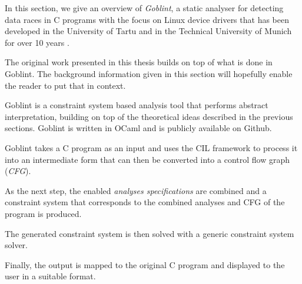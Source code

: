 \documentclass[..thesis.tex]{subfiles}
\begin{document}

In this section, we give an overview of \textit{Goblint}, a static analyser for detecting data races in C programs with the focus on Linux device drivers
that has been developed in the University of Tartu and in the Technical University of Munich for over 10 years
\cite{vojdani_static_2016,_goblint_????,apinis_frameworks_2014,vojdanivesal_static_2010}.



The original work presented in this thesis builds on top of what is done in Goblint.
The background information given in this section will hopefully enable the reader to put that in context.



Goblint is a constraint system based analysis tool that performs abstract interpretation,
building on top of the theoretical ideas described in the previous sections. Goblint is written in OCaml and is publicly available on Github.

Goblint takes a C program as an input and uses the CIL framework \cite{necula_cil:_2002} to process it into an intermediate form that can then be converted into a control flow graph (\textit{CFG}). 


As the next step, the enabled \textit{analyses specifications} are combined and a constraint system that corresponds to the combined analyses and CFG of the program is produced.

The generated constraint system is then solved with a generic constraint system solver. 

Finally, the output is mapped to the original C program and displayed to the user in a suitable format.
\end{document}
